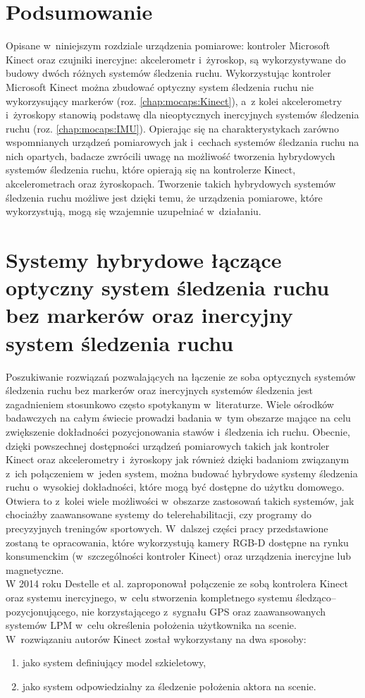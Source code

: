 \section{Podsumowanie}
Opisane w~niniejszym rozdziale urządzenia pomiarowe: kontroler Microsoft Kinect oraz czujniki inercyjne: akcelerometr i~żyroskop, są wykorzystywane do budowy dwóch różnych systemów śledzenia ruchu. Wykorzystując kontroler Microsoft Kinect można zbudować optyczny system śledzenia ruchu nie wykorzysujący markerów (roz. \ref{chap:mocaps:Kinect}), a~z kolei akcelerometry i~żyroskopy stanowią podstawę dla nieoptycznych inercyjnych systemów śledzenia ruchu (roz. \ref{chap:mocaps:IMU}). Opierając się na charakterystykach zarówno wspomnianych urządzeń pomiarowych jak i~cechach systemów śledzania ruchu na nich opartych, badacze zwrócili uwagę na możliwość tworzenia hybrydowych systemów śledzenia ruchu, które opierają się na kontrolerze Kinect, akcelerometrach oraz żyroskopach. Tworzenie takich hybrydowych systemów śledzenia ruchu możliwe jest dzięki temu, że urządzenia pomiarowe, które wykorzystują, mogą się wzajemnie uzupełniać w~działaniu.
																																																			
\section{Systemy hybrydowe łączące optyczny system śledzenia ruchu bez markerów oraz inercyjny system śledzenia ruchu}
Poszukiwanie rozwiązań pozwalających na łączenie ze soba optycznych systemów śledzenia ruchu bez markerów oraz inercyjnych systemów śledzenia jest zagadnieniem stosunkowo często spotykanym w~literaturze. Wiele ośrodków badawczych na całym świecie prowadzi badania w~tym obszarze mające na celu zwiększenie dokładności pozycjonowania stawów i~śledzenia ich ruchu. Obecnie, dzięki powszechnej dostępności urządzeń pomiarowych takich jak kontroler Kinect oraz akcelerometry i~żyroskopy jak również dzięki badaniom związanym z~ich połączeniem w~jeden system, można budować hybrydowe systemy śledzenia ruchu o~wysokiej dokładności, które mogą być dostępne do użytku domowego. Otwiera to z~kolei wiele możliwości w~obszarze zastosowań takich systemów, jak chociażby zaawansowane systemy do telerehabilitacji, czy programy do precyzyjnych treningów sportowych. W~dalszej części pracy przedstawione zostaną te opracowania, które wykorzystują kamery RGB-D dostępne na rynku konsumenckim (w~szczególności kontroler Kinect) oraz urządzenia inercyjne lub magnetyczne. \\
W 2014 roku Destelle et al. \cite{Destelle2014} zaproponował połączenie ze sobą kontrolera Kinect oraz systemu inercyjnego, w~celu stworzenia kompletnego systemu śledząco--pozycjonującego, nie korzystającego z~sygnału GPS oraz zaawansowanych systemów LPM w~celu określenia położenia użytkownika na scenie. W~rozwiązaniu autorów Kinect został wykorzystany na dwa sposoby:
\begin{enumerate}
	\item jako system definiujący model szkieletowy,
	\item jako system odpowiedzialny za śledzenie położenia aktora na scenie.
\end{enumerate}
																																																	
